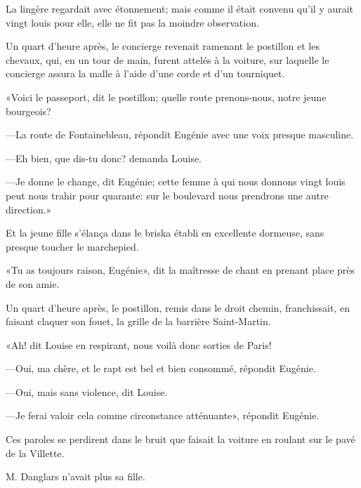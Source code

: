 La lingère regardait avec étonnement; mais comme il était convenu qu'il y aurait vingt louis pour elle, elle ne fit pas la moindre observation. 

Un quart d'heure après, le concierge revenait ramenant le postillon et les chevaux, qui, en un tour de main, furent attelés à la voiture, sur laquelle le concierge assura la malle à l'aide d'une corde et d'un tourniquet. 

«Voici le passeport, dit le postillon; quelle route prenons-nous, notre jeune bourgeois? 

—La route de Fontainebleau, répondit Eugénie avec une voix presque masculine. 

—Eh bien, que dis-tu donc? demanda Louise. 

—Je donne le change, dit Eugénie; cette femme à qui nous donnons vingt louis peut nous trahir pour quarante: sur le boulevard nous prendrons une autre direction.» 

Et la jeune fille s'élança dans le briska établi en excellente dormeuse, sans presque toucher le marchepied. 

«Tu as toujours raison, Eugénie», dit la maîtresse de chant en prenant place près de son amie. 

Un quart d'heure après, le postillon, remis dans le droit chemin, franchissait, en faisant claquer son fouet, la grille de la barrière Saint-Martin. 

«Ah! dit Louise en respirant, nous voilà donc sorties de Paris! 

—Oui, ma chère, et le rapt est bel et bien consommé, répondit Eugénie. 

—Oui, mais sans violence, dit Louise. 

—Je ferai valoir cela comme circonstance atténuante», répondit Eugénie. 

Ces paroles se perdirent dans le bruit que faisait la voiture en roulant sur le pavé de la Villette. 

M. Danglars n'avait plus sa fille. 